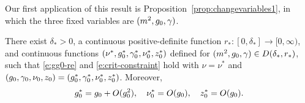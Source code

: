 Our first application of this result is Proposition~\ref{prop:changevariables1},
in which the three fixed variables are $(m^2, g_0, \gamma)$.

\begin{prop}
\label{prop:changevariables1}
There exist $\delta_* > 0$,
a continuous positive-definite function $r_* : [0, \delta_*] \to [0, \infty)$,
and continuous functions $(\nu^*, g_0^*, \gamma_0^*, \nu_0^*, z_0^*)$
defined for $(m^2, g_0, \gamma) \in D(\delta_*, r_*)$, such that
\eqref{e:gg0-re} and \eqref{e:crit-constraint} hold with $\nu = \nu^*$ and
$(g_0, \gamma_0, \nu_0, z_0) = (g^*_0, \gamma^*_0, \nu^*_0, z^*_0)$.
Moreover,
\begin{gather}
\label{e:gznustarbd}
g_0^* = g_0 + O(g_0^2),
\quad
\nu_0^* = O(g_0),
\quad
z_0^* = O(g_0).
\end{gather}
\end{prop}

